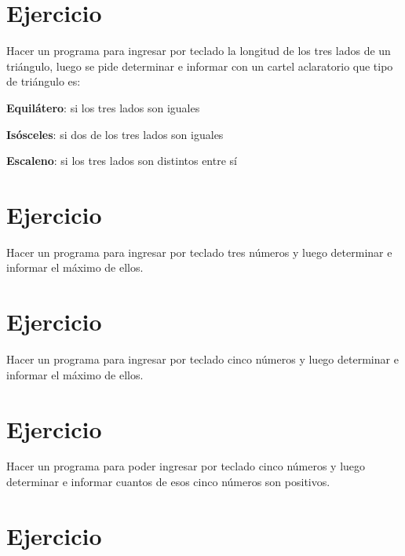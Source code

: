 \documentclass[12pt,a4paper,twoside]{article}
\begin{document}
\newpage

\section{Ejercicio }

\hspace*{1cm}Hacer un programa para ingresar por teclado la longitud de los tres lados de un triángulo, luego se pide determinar e informar con un cartel aclaratorio que tipo de triángulo es:
\begin{list}{•}{}
\item \textbf{Equilátero}: si los tres lados son iguales
\item \textbf{Isósceles}: si dos de los tres lados son iguales
\item \textbf{Escaleno}: si los tres lados son distintos entre sí
\end{list}

\newpage

\section{Ejercicio }

\hspace*{1cm}Hacer un programa para ingresar por teclado tres números y luego determinar e informar el máximo de ellos.

\newpage

\section{Ejercicio }

\hspace*{1cm}Hacer un programa para ingresar por teclado cinco números y luego determinar e informar el máximo de ellos.

\newpage

\section{Ejercicio }

\hspace*{1cm}Hacer un programa para poder ingresar por teclado cinco números y luego determinar e informar cuantos de esos cinco números son positivos.

\newpage

\section{Ejercicio }
\end{document}
